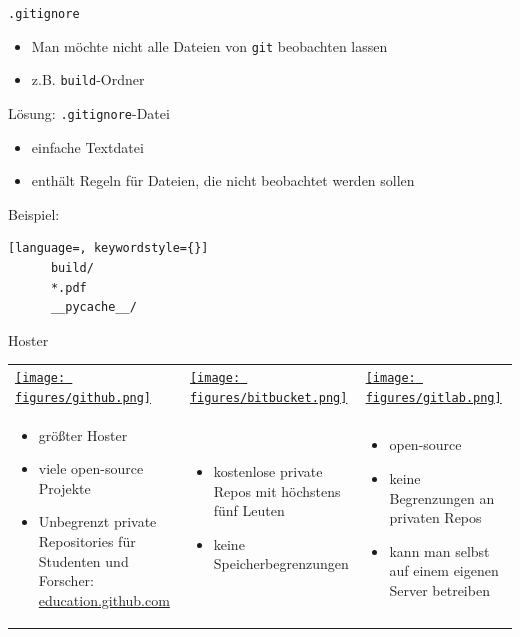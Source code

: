 \begin{frame}[fragile]{\texttt{.gitignore}}
    \begin{itemize}
    \item Man möchte nicht alle Dateien von \texttt{git} beobachten lassen
    \item z.B. \texttt{build}-Ordner
    \end{itemize}
    \begin{center}
        \Large Lösung: \texttt{.gitignore}-Datei
    \end{center}

    \begin{itemize}
    \item einfache Textdatei
    \item enthält Regeln für Dateien, die nicht beobachtet werden sollen
    \end{itemize}
    Beispiel:
    \vspace{1em}
    \begin{lstlisting}[language=, keywordstyle={}]
      build/
      *.pdf
      __pycache__/
    \end{lstlisting}
\end{frame}

\begin{frame}{Hoster}
  \begin{tabu}{@{} X[,C] @{} X[,C] @{} X[,C] @{}}
    \href{https://github.com}{\texttt{[image: figures/github.png]}} &
    \href{https://bitbucket.org}{\texttt{[image: figures/bitbucket.png]}} &
    \href{https://gitlab.com}{\texttt{[image: figures/gitlab.png]}} \\
    \begin{itemize}
      \item größter Hoster
      \item viele open-source Projekte
      \item Unbegrenzt private Repositories für Studenten und Forscher:  \newline
        \href{http://education.github.com}{education.github.com}
    \end{itemize}
    &
    \begin{itemize}
      \item kostenlose private Repos mit höchstens fünf Leuten
      \item keine Speicherbegrenzungen
    \end{itemize}
    &
    \begin{itemize}
      \item open-source
      \item keine Begrenzungen an privaten Repos
      \item kann man selbst auf einem eigenen Server betreiben
    \end{itemize}
  \end{tabu}
  \begin{center}
  \end{center}
\end{frame}

